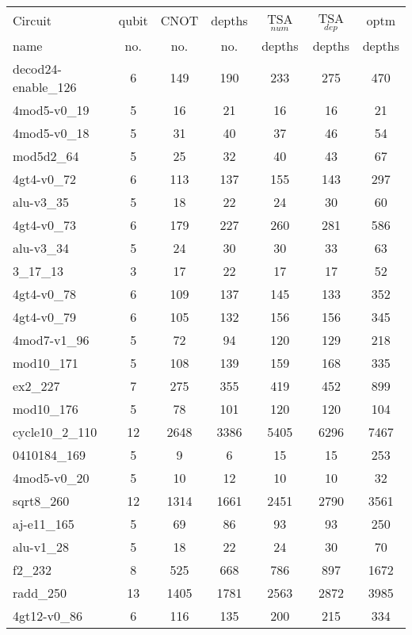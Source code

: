 \documentclass[journal]{IEEEtran}
\begin{document}
\begin{table*}[htbp]
    \begin{center}  
        \begin{tabular}{|p{4.3cm}<{\centering}|c|c|c|c|c|c|}
            \hline
                        Circuit &  qubit  & CNOT &depths &TSA$_{num}$& TSA$_{dep}$  & optm 	  	\\
                         name	&   no. 	&	no. & no. & depths&  depths &  depths 	\\
                        \hline
                        decod24-enable\_126 & 6 & 149 & 190 & 233 & 275 & 470 \\
4mod5-v0\_19 & 5 & 16 & 21 & 16 & 16 & 21 \\
4mod5-v0\_18 & 5 & 31 & 40 & 37 & 46 & 54 \\
mod5d2\_64 & 5 & 25 & 32 & 40 & 43 & 67 \\
4gt4-v0\_72 & 6 & 113 & 137 & 155 & 143 & 297 \\
alu-v3\_35 & 5 & 18 & 22 & 24 & 30 & 60 \\
4gt4-v0\_73 & 6 & 179 & 227 & 260 & 281 & 586 \\
alu-v3\_34 & 5 & 24 & 30 & 30 & 33 & 63 \\
3\_17\_13 & 3 & 17 & 22 & 17 & 17 & 52 \\
4gt4-v0\_78 & 6 & 109 & 137 & 145 & 133 & 352 \\
4gt4-v0\_79 & 6 & 105 & 132 & 156 & 156 & 345 \\
4mod7-v1\_96 & 5 & 72 & 94 & 120 & 129 & 218 \\
mod10\_171 & 5 & 108 & 139 & 159 & 168 & 335 \\
ex2\_227 & 7 & 275 & 355 & 419 & 452 & 899 \\
mod10\_176 & 5 & 78 & 101 & 120 & 120 & 104 \\
cycle10\_2\_110 & 12 & 2648 & 3386 & 5405 & 6296 & 7467 \\
0410184\_169 & 5 & 9 & 6 & 15 & 15 & 253 \\
4mod5-v0\_20 & 5 & 10 & 12 & 10 & 10 & 32 \\
sqrt8\_260 & 12 & 1314 & 1661 & 2451 & 2790 & 3561 \\
aj-e11\_165 & 5 & 69 & 86 & 93 & 93 & 250 \\
alu-v1\_28 & 5 & 18 & 22 & 24 & 30 & 70 \\
f2\_232 & 8 & 525 & 668 & 786 & 897 & 1672 \\
radd\_250 & 13 & 1405 & 1781 & 2563 & 2872 & 3985 \\
4gt12-v0\_86 & 6 & 116 & 135 & 200 & 215 & 334 \\

\end{tabular}
\end{center}
\end{table*}
\end{document}
